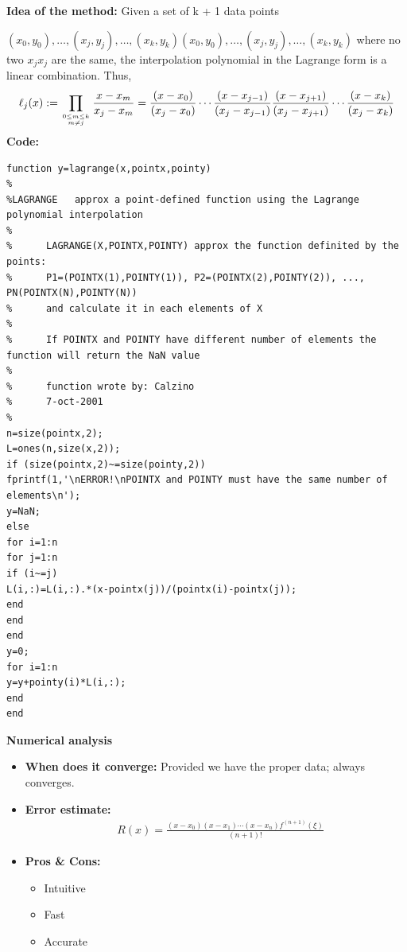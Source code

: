 \documentclass{article}
\begin{document}
{\bf Idea of the method:} 
Given a set of k + 1 data points

$ 	{\displaystyle (x_{0},y_{0}),\ldots ,(x_{j},y_{j}),\ldots ,(x_{k},y_{k})} (x_{0},y_{0}),\ldots ,(x_{j},y_{j}),\ldots ,(x_{k},y_{k}) $
where no two $ {\displaystyle x_{j}} x_{j} $ are the same, the interpolation polynomial in the Lagrange form is a linear combination. Thus,
\[\ell _ { j } ( x ) : = \prod _ { 0 \leq m \leq k \atop m \neq j } \frac { x - x _ { m } } { x _ { j } - x _ { m } } = \frac { \left( x - x _ { 0 } \right) } { \left( x _ { j } - x _ { 0 } \right) } \cdots \frac { \left( x - x _ { j - 1 } \right) } { \left( x _ { j } - x _ { j - 1 } \right) } \frac { \left( x - x _ { j + 1 } \right) } { \left( x _ { j } - x _ { j + 1 } \right) } \cdots \frac { \left( x - x _ { k } \right) } { \left( x _ { j } - x _ { k } \right) }\]
{\bf Code:}
\begin{verbatim}
function y=lagrange(x,pointx,pointy)
%
%LAGRANGE   approx a point-defined function using the Lagrange polynomial interpolation
%
%      LAGRANGE(X,POINTX,POINTY) approx the function definited by the points:
%      P1=(POINTX(1),POINTY(1)), P2=(POINTX(2),POINTY(2)), ..., PN(POINTX(N),POINTY(N))
%      and calculate it in each elements of X
%
%      If POINTX and POINTY have different number of elements the function will return the NaN value
%
%      function wrote by: Calzino
%      7-oct-2001
%
n=size(pointx,2);
L=ones(n,size(x,2));
if (size(pointx,2)~=size(pointy,2))
fprintf(1,'\nERROR!\nPOINTX and POINTY must have the same number of elements\n');
y=NaN;
else
for i=1:n
for j=1:n
if (i~=j)
L(i,:)=L(i,:).*(x-pointx(j))/(pointx(i)-pointx(j));
end
end
end
y=0;
for i=1:n
y=y+pointy(i)*L(i,:);
end
end
\end{verbatim}
{\bf Numerical analysis}
\begin{itemize}
	\item{\bf When does it converge:} Provided we have the proper data; always converges.
	\item {\bf Error estimate:}
	\begin{equation}
	\begin{split}
	&R ( x ) = \frac { \left( x - x _ { 0 } \right) \left( x - x _ { 1 } \right) \cdots \left( x - x _ { n } \right) f ^ { ( n + 1 ) } ( \xi ) } { ( n + 1 ) ! }
	\end{split}
	\end{equation}
	\item {\bf Pros \& Cons:}
	\begin{itemize}
		\item Intuitive
		\item Fast
		\item Accurate
	\end{itemize}
\end{itemize}
\end{document}
